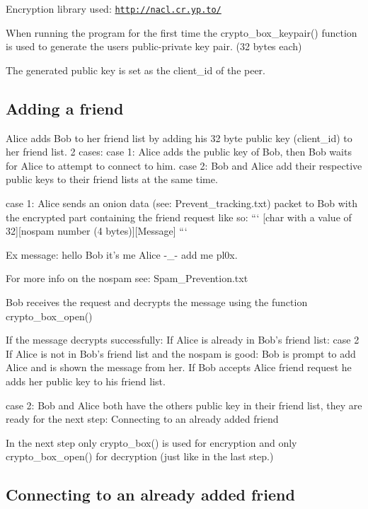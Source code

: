 Encryption library used\+: \href{http://nacl.cr.yp.to/}{\tt http\+://nacl.\+cr.\+yp.\+to/}

When running the program for the first time the crypto\+\_\+box\+\_\+keypair() function is used to generate the users public-\/private key pair. (32 bytes each)

The generated public key is set as the client\+\_\+id of the peer.

\subsection*{Adding a friend }

Alice adds Bob to her friend list by adding his 32 byte public key (client\+\_\+id) to her friend list. 2 cases\+: case 1\+: Alice adds the public key of Bob, then Bob waits for Alice to attempt to connect to him. case 2\+: Bob and Alice add their respective public keys to their friend lists at the same time.

case 1\+: Alice sends an onion data (see\+: Prevent\+\_\+tracking.\+txt) packet to Bob with the encrypted part containing the friend request like so\+: ``` \mbox{[}char with a value of 32\mbox{]}\mbox{[}nospam number (4 bytes)\mbox{]}\mbox{[}Message\mbox{]} ```

Ex message\+: hello Bob it's me Alice -\/\+\_\+-\/ add me pl0x.

For more info on the nospam see\+: Spam\+\_\+\+Prevention.\+txt

Bob receives the request and decrypts the message using the function crypto\+\_\+box\+\_\+open()

If the message decrypts successfully\+: If Alice is already in Bob's friend list\+: case 2 If Alice is not in Bob's friend list and the nospam is good\+: Bob is prompt to add Alice and is shown the message from her. If Bob accepts Alice friend request he adds her public key to his friend list.

case 2\+: Bob and Alice both have the others public key in their friend list, they are ready for the next step\+: Connecting to an already added friend

In the next step only crypto\+\_\+box() is used for encryption and only crypto\+\_\+box\+\_\+open() for decryption (just like in the last step.)

\subsection*{Connecting to an already added friend }

